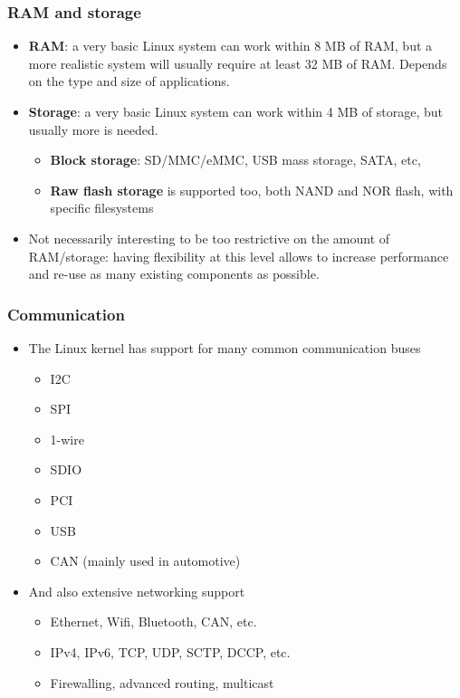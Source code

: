 \begin{frame}
  \frametitle{RAM and storage}
  \begin{itemize}
  \item {\bf RAM}: a very basic Linux system can work within 8 MB of
    RAM, but a more realistic system will usually require at least 32
    MB of RAM. Depends on the type and size of applications.
  \item {\bf Storage}: a very basic Linux system can work within 4 MB
    of storage, but usually more is needed.
    \begin{itemize}
    \item {\bf Block storage}: SD/MMC/eMMC, USB mass storage, SATA, etc,
    \item {\bf Raw flash storage} is supported too, both NAND and NOR flash, with
      specific filesystems
    \end{itemize}
  \item Not necessarily interesting to be too restrictive on the
    amount of RAM/storage: having flexibility at this level allows to
    increase performance and re-use as many existing components as possible.
  \end{itemize}
\end{frame}

\begin{frame}
  \frametitle{Communication}
  \begin{itemize}
  \item The Linux kernel has support for many common communication
    buses
    \begin{itemize}
    \item I2C
    \item SPI
    \item 1-wire
    \item SDIO
    \item PCI
    \item USB
    \item CAN (mainly used in automotive)
    \end{itemize}
  \item And also extensive networking support
    \begin{itemize}
    \item Ethernet, Wifi, Bluetooth, CAN, etc.
    \item IPv4, IPv6, TCP, UDP, SCTP, DCCP, etc.
    \item Firewalling, advanced routing, multicast
    \end{itemize}
  \end{itemize}
\end{frame}

